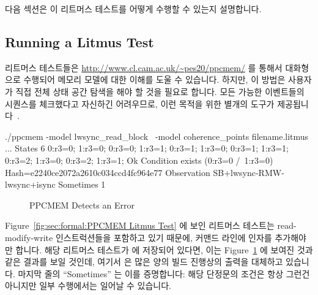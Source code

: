 다음 섹션은 이 리트머스 테스트를 어떻게 수행할 수 있는지 설명합니다.
\iffalse

Putting all this together, the C-language equivalent to the entire litmus
test is as shown in
Figure~\ref{fig:sec:formal:Meaning of PPCMEM Litmus Test}.
The key point is that if \co{atomic_add_return()} acts as a full
memory barrier (as the Linux kernel requires it to), 
then it should be impossible for \co{P0()}'s and \co{P1()}'s \co{r3}
variables to both be zero after execution completes.

The next section describes how to run this litmus test.
\fi

\subsection{Running a Litmus Test}
\label{sec:formal:Running a Litmus Test}

리트머스 테스트들은
\url{http://www.cl.cam.ac.uk/~pes20/ppcmem/} 를 통해서 대화형으로 수행되어
메모리 모델에 대한 이해를 도울 수 있습니다.
하지만, 이 방법은 사용자가 직접 전체 상태 공간 탐색을 해야 할 것을 필요로
합니다.
모든 가능한 이벤트들의 시퀀스를 체크했다고 자신하긴 어려우므로, 이런 목적을
위한 별개의 도구가 제공됩니다~\cite{PaulEMcKenney2011ppcmem}.
\iffalse

Although litmus tests may be run interactively via
\url{http://www.cl.cam.ac.uk/~pes20/ppcmem/}, which can help build an
understanding of the memory model.
However, this approach requires that the user manually carry out the
full state-space search.
Because it is very difficult to be sure that you have checked every
possible sequence of events, a separate tool is provided for this
purpose~\cite{PaulEMcKenney2011ppcmem}.
\fi

{ \scriptsize
\begin{verbbox}
./ppcmem -model lwsync_read_block \
         -model coherence_points filename.litmus
...
States 6
0:r3=0; 1:r3=0;
0:r3=0; 1:r3=1;
0:r3=1; 1:r3=0;
0:r3=1; 1:r3=1;
0:r3=2; 1:r3=0;
0:r3=2; 1:r3=1;
Ok
Condition exists (0:r3=0 /\ 1:r3=0)
Hash=e2240ce2072a2610c034ccd4fc964e77
Observation SB+lwsync-RMW-lwsync+isync Sometimes 1
\end{verbbox}
}
\begin{figure}[tbp]
\centering
\theverbbox
\caption{PPCMEM Detects an Error}
\label{fig:sec:formal:PPCMEM Detects an Error}
\end{figure}

Figure~\ref{fig:sec:formal:PPCMEM Litmus Test}
에 보인 리트머스 테스트는 read-modify-write 인스트럭션들을 포함하고 있기
때문에, 커맨드 라인에  인자를 추가해야만 합니다.
해당 리트머스 테스트가  에 저장되어 있다면, 이는
Figure~\ref{fig:sec:formal:PPCMEM Detects an Error} 에 보여진 것과 같은 결과를
보일 것인데, 여기서 \co{...} 은 많은 양의 빌드 진행상의 출력을 대체하고
있습니다.
마지막 줄의 ``Sometimes'' 는 이를 증명합니다: 해당 단정문의 조건은 항상 그런건
아니지만 일부 수행에서는 일어날 수 있습니다.
\iffalse

